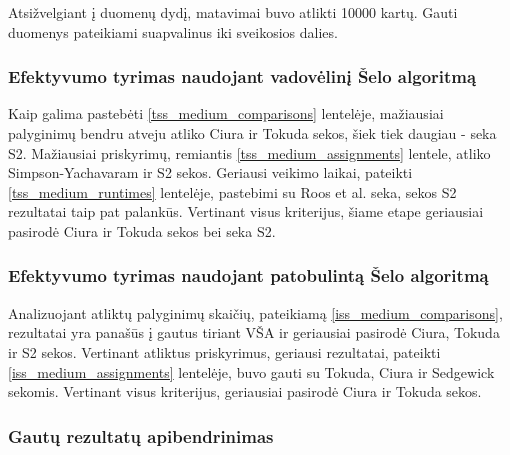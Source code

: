 \documentclass{VUMIFInfKursinis}
\begin{document}
Atsižvelgiant į duomenų dydį, matavimai buvo atlikti 10000 kartų.
Gauti duomenys pateikiami suapvalinus iki sveikosios dalies.

\subsubsection{Efektyvumo tyrimas naudojant vadovėlinį Šelo algoritmą}

Kaip galima pastebėti \ref{tss_medium_comparisons} lentelėje, mažiausiai palyginimų bendru atveju atliko Ciura ir Tokuda sekos, šiek tiek daugiau - seka S2.
Mažiausiai priskyrimų, remiantis \ref{tss_medium_assignments} lentele, atliko Simpson-Yachavaram ir S2 sekos.
Geriausi veikimo laikai, pateikti \ref{tss_medium_runtimes} lentelėje, pastebimi su Roos et al. seka, sekos S2 rezultatai taip pat palankūs.
Vertinant visus kriterijus, šiame etape geriausiai pasirodė Ciura ir Tokuda sekos bei seka S2.

\subsubsection{Efektyvumo tyrimas naudojant patobulintą Šelo algoritmą}

Analizuojant atliktų palyginimų skaičių, pateikiamą \ref{iss_medium_comparisons}, rezultatai yra panašūs į gautus tiriant VŠA
ir geriausiai pasirodė Ciura, Tokuda ir S2 sekos.
Vertinant atliktus priskyrimus, geriausi rezultatai, pateikti \ref{iss_medium_assignments} lentelėje, buvo gauti su Tokuda, Ciura ir Sedgewick sekomis.
Vertinant visus kriterijus, geriausiai pasirodė Ciura ir Tokuda sekos.

\subsubsection{Gautų rezultatų apibendrinimas}
\end{document}
